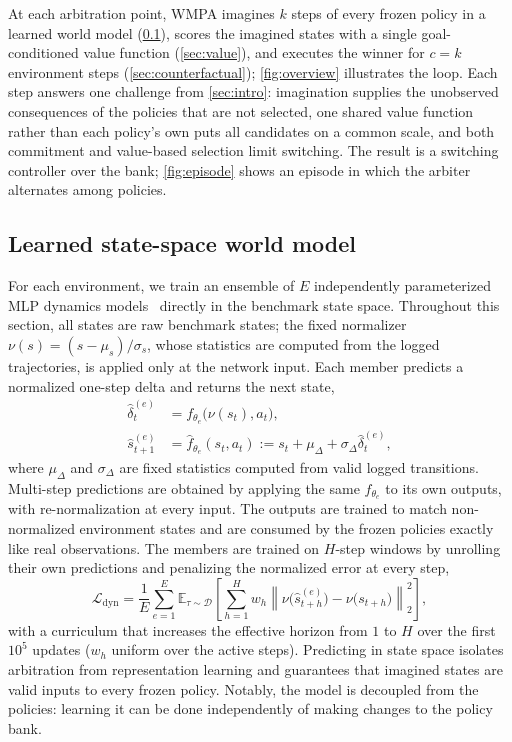 \documentclass{article}
\theoremstyle{plain}
\theoremstyle{definition}
\theoremstyle{plain}
\newcommand{\wmpa}{\textsc{WMPA}}
\newcommand{\E}{\mathbb{E}}
\newcommand{\calD}{\mathcal{D}}
\begin{document}
At each arbitration point, \wmpa{} imagines $k$ steps of every frozen policy in a learned world model (\cref{sec:dynamics}), scores the imagined states with a single goal-conditioned value function (\cref{sec:value}), and executes the winner for $c=k$ environment steps (\cref{sec:counterfactual}); \cref{fig:overview} illustrates the loop.
Each step answers one challenge from \cref{sec:intro}: imagination supplies the unobserved consequences of the policies that are not selected, one shared value function rather than each policy's own puts all candidates on a common scale, and both commitment and value-based selection limit switching.
The result is a switching controller over the bank; \cref{fig:episode} shows an episode in which the arbiter alternates among policies.

\subsection{Learned state-space world model}
\label{sec:dynamics}
For each environment, we train an ensemble of $E$ independently parameterized MLP dynamics models~\citep{kurutach2018model} directly in the benchmark state space. Throughout this section, all states are raw benchmark states; the fixed normalizer $\nu(s)=(s-\mu_s)/\sigma_s$, whose statistics are computed from the logged trajectories, is applied only at the network input. Each member predicts a normalized one-step delta and returns the next state,
\begin{align}
\hat{\delta}^{(e)}_t &= f_{\theta_e}\big(\nu(s_t),a_t\big),\\
\hat{s}^{(e)}_{t+1} &= \hat f_{\theta_e}(s_t,a_t) := s_t + \mu_{\Delta}+\sigma_{\Delta}\hat{\delta}^{(e)}_t,
\end{align}
where $\mu_{\Delta}$ and $\sigma_{\Delta}$ are fixed statistics computed from valid logged transitions. Multi-step predictions are obtained by applying the same $\hat f_{\theta_e}$ to its own outputs, with re-normalization at every input. The outputs are trained to match non-normalized environment states and are consumed by the frozen policies exactly like real observations. The members are trained on $H$-step windows by unrolling their own predictions and penalizing the normalized error at every step,
\begin{equation}
\mathcal{L}_{\mathrm{dyn}} = \frac{1}{E}\sum_{e=1}^{E}
\E_{\tau\sim\calD}
\left[\sum_{h=1}^{H} w_h\left\|\nu\big(\hat{s}^{(e)}_{t+h}\big)-\nu\big(s_{t+h}\big)\right\|_2^2\right],
\end{equation}
with a curriculum that increases the effective horizon from $1$ to $H$ over the first $10^5$ updates ($w_h$ uniform over the active steps). Predicting in state space isolates arbitration from representation learning and guarantees that imagined states are valid inputs to every frozen policy. Notably, the model is decoupled from the policies: learning it can be done independently of making changes to the policy bank.
\end{document}
